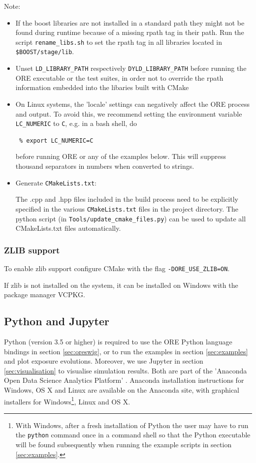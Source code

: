 \documentclass[12pt, a4paper]{article}
\begin{document}
Note: 
\begin{itemize}
\item If the boost libraries are not installed in a standard path they might not be found during runtime because of a missing rpath
tag in their path. Run the script {\tt rename\_libs.sh} to set the rpath tag in all libraries located in {\tt
  \${BOOST}/stage/lib}.
\item Unset {\tt LD\_LIBRARY\_PATH} respectively {\tt DYLD\_LIBRARY\_PATH} before running the ORE executable or the test suites, in order not to override the rpath information embedded into the libaries built with CMake
\item On Linux systems, the 'locale' settings can negatively affect the ORE process and output. To avoid this, we
recommend setting the environment variable {\tt LC\_NUMERIC} to {\tt C}, e.g. in a bash shell, do

{\tt\footnotesize
\% export LC\_NUMERIC=C
}

before running ORE or any of the examples below. This will suppress thousand separators in numbers when converted to
strings.

\item Generate {\tt CMakeLists.txt}:

The .cpp and .hpp files included in the build process need to be explicitly specified in the various {\tt CMakeLists.txt} 
files in the project directory. The python script (in {\tt Tools/update\_cmake\_files.py}) can be used to update all CMakeLists.txt files 
automatically. 

\end{itemize}
 
\subsubsection*{ZLIB support}

To enable zlib support configure CMake with the flag {\tt -DORE\_USE\_ZLIB=ON}. 

If zlib is not installed on the system, it can be installed on Windows with the package manager VCPKG.

\subsection{Python and Jupyter}\label{sec:python}

Python (version 3.5 or higher) is required to use the ORE Python language bindings in section \ref{sec:oreswig}, 
or to run the examples in section \ref{sec:examples} and plot exposure
evolutions. Moreover, we use Jupyter \cite{jupyter} in section \ref{sec:visualisation} to visualise simulation
results. Both are part of the 'Anaconda Open Data Science Analytics Platform' \cite{Anaconda}. Anaconda installation
instructions for Windows, OS X and Linux are available on the Anaconda site, with graphical installers for
Windows\footnote{With Windows, after a fresh installation of Python the user may have to run the {\tt python} command
  once in a command shell so that the Python executable will be found subsequently when running the example scripts in
  section \ref{sec:examples}.}, Linux and OS X.
\end{document}
